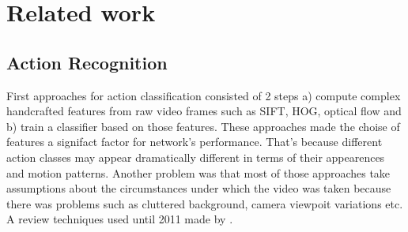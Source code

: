 
 
%  


% 

\chapter{Related work}




\section{Action Recognition}
First approaches for action classification consisted of 2 steps a) compute complex handcrafted features from raw video frames
such as SIFT, HOG, optical flow and b) train a classifier based on those features. These approaches made the choise of
features a signifact factor for network's performance. That's because different action classes may appear dramatically
different in terms of their appearences and motion patterns. Another problem was that most of those approaches take
assumptions about the circumstances under which the video was taken because there was problems such as cluttered
background, camera viewpoit variations etc. A review techniques used until 2011 made by \cite{Aggarwal:2011:HAA:1922649.1922653}.

